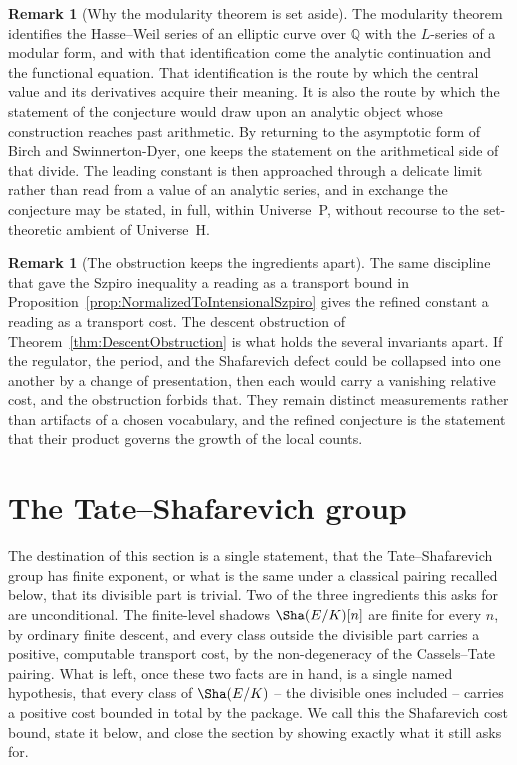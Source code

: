 \documentclass[10pt, reqno]{amsart}
\theoremstyle{plain}
\theoremstyle{definition}
\newtheorem{remark}[theorem]{Remark}
\theoremstyle{plain}
\newcommand{\Q}{\mathbb{Q}}
\begin{document}
\begin{remark}[Why the modularity theorem is set aside]\label{rem:WhyAvoidModularity}
The modularity theorem identifies the Hasse--Weil series of an elliptic curve over $\Q$ with the $L$-series of a modular form, and with that identification come the analytic continuation and the functional equation. That identification is the route by which the central value and its derivatives acquire their meaning. It is also the route by which the statement of the conjecture would draw upon an analytic object whose construction reaches past arithmetic. By returning to the asymptotic form of Birch and Swinnerton-Dyer, one keeps the statement on the arithmetical side of that divide. The leading constant is then approached through a delicate limit rather than read from a value of an analytic series, and in exchange the conjecture may be stated, in full, within Universe~P, without recourse to the set-theoretic ambient of Universe~H.
\end{remark}

\begin{remark}[The obstruction keeps the ingredients
apart]\label{rem:BSDLinkToFramework} The same discipline that gave the Szpiro inequality a reading as a transport bound in Proposition~\ref{prop:NormalizedToIntensionalSzpiro} gives the refined constant a reading as a transport cost. The descent obstruction of Theorem~\ref{thm:DescentObstruction} is what holds the several invariants apart. If the regulator, the period, and the Shafarevich defect could be collapsed into one another by a change of presentation, then each would carry a vanishing relative cost, and the obstruction forbids that. They remain distinct measurements rather than artifacts of a chosen vocabulary, and the refined conjecture is the statement that their product governs the growth of the local counts.
\end{remark}
\section{The Tate--Shafarevich group}\label{sec:TateShafarevich}

The destination of this section is a single statement, that the Tate--Shafarevich group has finite exponent, or what is the same under a classical pairing recalled below, that its divisible part is trivial. Two of the three ingredients this asks for are unconditional. The finite-level shadows $\Sha(E/K)[n]$ are finite for every $n$, by ordinary finite descent, and every class outside the divisible part carries a positive, computable transport cost, by the non-degeneracy of the Cassels--Tate pairing. What is left, once these two facts are in hand, is a single named hypothesis, that every class of $\Sha(E/K)$ -- the divisible ones included -- carries a positive cost bounded in total by the package. We call this the Shafarevich cost bound, state it below, and close the section by showing exactly what it still asks for.
\end{document}
